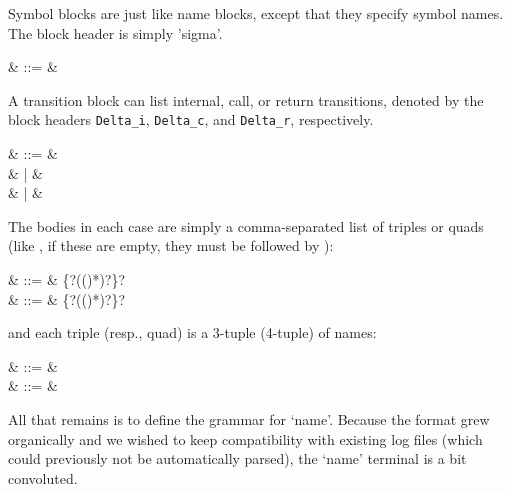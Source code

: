 Symbol blocks are just like name blocks, except that they specify symbol
names. The block header is simply 'sigma'.

\begin{grammar}
   & ::= & \cfgsp  {}
\end{grammar}

A transition block can list internal, call, or return transitions,
denoted by the block headers \texttt{Delta\_i}, \texttt{Delta\_c}, and
\texttt{Delta\_r}, respectively.
 
\begin{grammar}
   & ::= & \cfgsp  {} \\
                        &   | & \cfgsp  {} \\
                        &   | & \cfgsp  {}
\end{grammar}

The bodies in each case are simply a comma-separated list of triples
or quads (like , if these are empty, they must be followed
by \term{\}}):

\begin{grammar}
   & ::= & \term\{?\cfgsp(\cfgsp  (\term{,}\cfgsp  {})*)?\cfgsp\term\}? \\
     & ::= & \term\{?\cfgsp(\cfgsp  (\term{,}\cfgsp  {})*)?\cfgsp\term\}?
\end{grammar}

and each triple (resp., quad) is a 3-tuple (4-tuple) of names:

\begin{grammar}
   & ::= &  \term{(}\cfgsp  {}\cfgsp \term{,}\cfgsp  {}\cfgsp  \term{,}\cfgsp  {}\cfgsp  \term{)} \\
   & ::= &  \term{(}\cfgsp  {}\cfgsp \term{,}\cfgsp  {}\cfgsp  \term{,}\cfgsp  {}\cfgsp  \term{,}\cfgsp  {}\cfgsp  \term{)}
\end{grammar}


All that remains is to define the grammar for `name'. Because the
format grew organically and we wished to keep compatibility with
existing log files (which could previously not be automatically parsed),
the `name' terminal is a bit convoluted.

